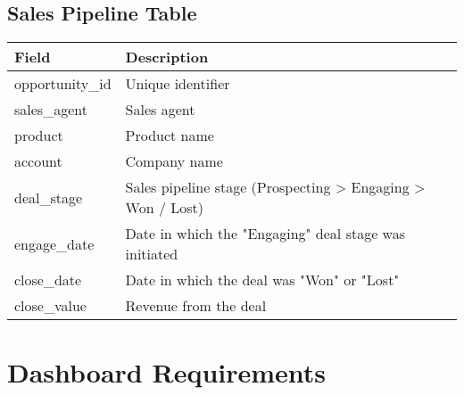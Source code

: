 \documentclass{article}
\begin{document}
\subsection{Sales Pipeline Table}
\begin{longtable}{|l|l|}
\hline
\textbf{Field} & \textbf{Description} \\ \hline
opportunity\_id & Unique identifier \\ \hline
sales\_agent & Sales agent \\ \hline
product & Product name \\ \hline
account & Company name \\ \hline
deal\_stage & Sales pipeline stage (Prospecting > Engaging > Won / Lost) \\ \hline
engage\_date & Date in which the "Engaging" deal stage was initiated \\ \hline
close\_date & Date in which the deal was "Won" or "Lost" \\ \hline
close\_value & Revenue from the deal \\ \hline
\end{longtable}

\section{Dashboard Requirements}
\end{document}
